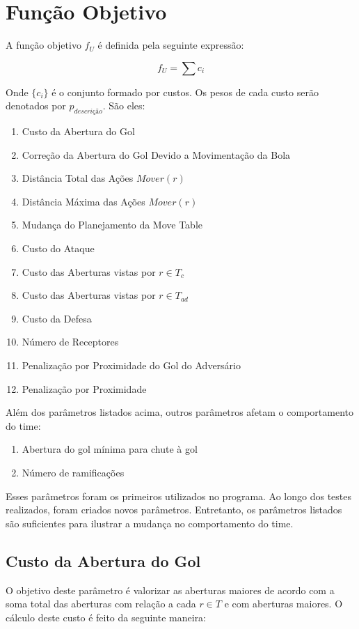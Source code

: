 \section{Função Objetivo}
A função objetivo $f_U$ é definida pela seguinte
expressão:

\begin{dmath}
  f_U = \sum c_i 
\end{dmath}

Onde $\lbrace c_i \rbrace$ é o conjunto formado por custos. Os pesos de
cada custo serão denotados por $p_{descrição}$. São eles:
\begin{enumerate}
  \item Custo da Abertura do Gol
  \item Correção da Abertura do Gol Devido a Movimentação da Bola
  \item Distância Total das Ações $Mover(r)$
  \item Distância Máxima das Ações $Mover(r)$
  \item Mudança do Planejamento da Move Table
  \item Custo do Ataque
  \item Custo das Aberturas vistas por $r \in T_c$
  \item Custo das Aberturas vistas por $r \in T_{ad}$
  \item Custo da Defesa
  \item Número de Receptores
  \item Penalização por Proximidade do Gol do Adversário
  \item Penalização por Proximidade
\end{enumerate}

Além dos parâmetros listados acima, outros parâmetros
afetam o comportamento do time:
\begin{enumerate}
  \item Abertura do gol mínima para chute à gol
  \item Número de ramificações
\end{enumerate}

Esses parâmetros foram os primeiros utilizados no programa.
Ao longo dos testes realizados, foram criados novos parâmetros.
Entretanto, os parâmetros listados são suficientes para ilustrar
a mudança no comportamento do time.

\subsection{Custo da Abertura do Gol}\label{subsec:custo_gap}
O objetivo deste parâmetro é valorizar as aberturas maiores
de acordo com a soma total das aberturas com relação a cada
$r \in T$ e com aberturas maiores.
O cálculo deste custo é feito da seguinte maneira:

